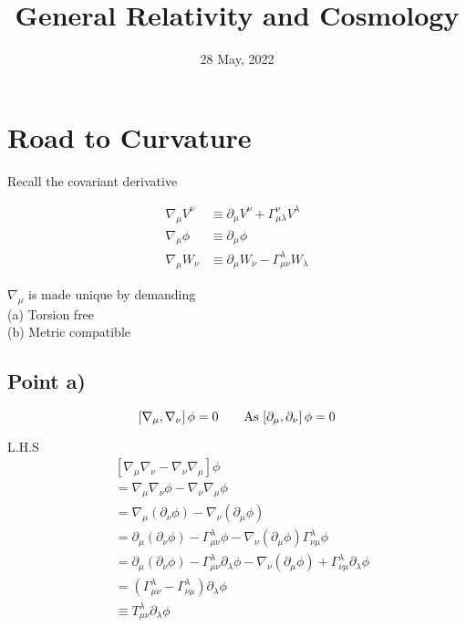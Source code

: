 \documentclass[12pt, letterpaper]{article}
\title {General Relativity and Cosmology}
\author{}
\date{28 May, 2022}
\newcommand*{\1}{\hspace{1pt}}
\begin{document}
    
    \section{Road to Curvature}
        Recall the covariant derivative
        
        \begin{equation}
            \begin{split}
                \nabla _{\mu} V^{\nu} & \equiv \partial _{\mu}V^{\nu} + \Gamma ^{\nu}_{\mu \lambda}V^{\lambda} \\ 
                \nabla _{\mu} \phi &\equiv \partial _{\mu} \phi \\
                \nabla _{\mu} W_{\nu} &\equiv \partial _{\mu}W_{\nu} -  \Gamma ^{\lambda} _{\mu \nu} W_{\lambda}
            \end{split}
        \end{equation}

        $\nabla _{\mu}$ is made unique by demanding\\ 
        (a) Torsion free\\
        (b) Metric compatible

    \subsection*{Point a)}
        \begin{equation}
            \left[\nabla _{\mu}, \nabla _{\nu}\right] \phi = 0  \tag*{As $\left[\partial _{\mu}, \partial _{\nu}\right] \phi = 0$}
        \end{equation}

        L.H.S
        \begin{equation}
            \begin{split}
                 &\left[\nabla _{\mu}\nabla_{\nu} - \nabla _{\nu}\nabla_{\mu}\right] \phi \\
                 & = \nabla _{\mu}\nabla_{\nu}\phi - \nabla _{\nu}\nabla_{\mu} \phi \\ 
                 & = \nabla _{\mu}(\partial_{\nu}\phi) - \nabla _{\nu}(\partial_{\mu} \phi) \\
                 & = \partial _{\mu}(\partial_{\nu}\phi) - \Gamma ^{\lambda} _{\mu \nu} \phi - \nabla _{\nu}(\partial_{\mu} \phi) \Gamma ^{\lambda} _{\nu \mu} \phi\\
                 & = \partial _{\mu}(\partial_{\nu}\phi) - \Gamma ^{\lambda} _{\mu \nu} \partial _{\lambda} \phi - \nabla _{\nu}(\partial_{\mu} \phi) + \Gamma ^{\lambda} _{\nu \mu} \partial _{\lambda} \phi\\
                 & = \left(\Gamma ^{\lambda} _{\mu \nu} - \Gamma ^{\lambda} _{\nu \mu}\right) \partial _{\lambda} \phi \\ 
                 & \equiv T^{\lambda} _{\mu \nu} \partial _{\lambda} \phi
            \end{split}
        \end{equation}
\end{document}
